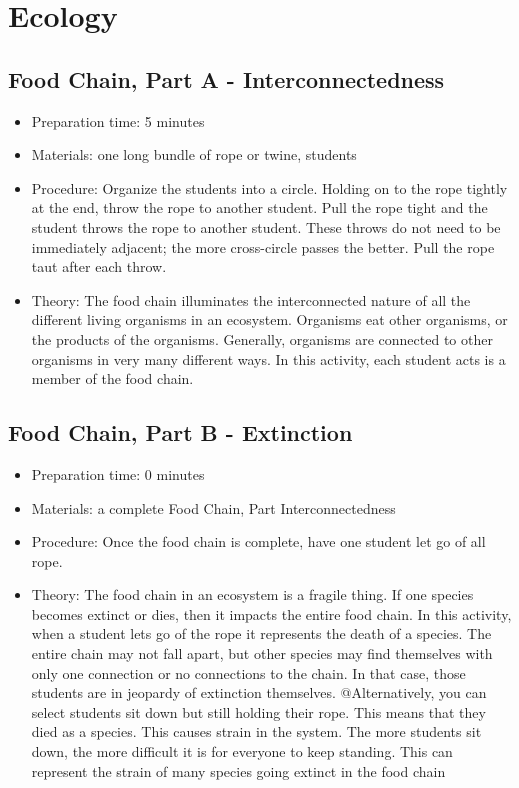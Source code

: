 \section{Ecology}
\subsection{Food Chain, Part A - Interconnectedness}
\begin{itemize}
\item{Preparation time: 5 minutes}
\item{Materials: one long bundle of rope or twine, students}
\item{Procedure: Organize the students into a circle. Holding on to the rope tightly at the end, throw the rope to another student. Pull the rope tight and the student throws the rope to another student. These throws do not need to be immediately adjacent; the more cross-circle passes the better. Pull the rope taut after each throw.}
\item{Theory: The food chain illuminates the interconnected nature of all the different living organisms in an ecosystem. Organisms eat other organisms, or the products of the organisms. Generally, organisms are connected to other organisms in very many different ways. In this activity, each student acts is a member of the food chain.}
\end{itemize}

\subsection{Food Chain, Part B - Extinction}
\begin{itemize}
\item{Preparation time: 0 minutes}
\item{Materials: a complete Food Chain, Part Interconnectedness}
\item{Procedure: Once the food chain is complete, have one student let go of all rope.}
\item{Theory: The food chain in an ecosystem is a fragile thing. If one species becomes extinct or dies, then it impacts the entire food chain. In this activity, when a student lets go of the rope it represents the death of a species. The entire chain may not fall apart, but other species may find themselves with only one connection or no connections to the chain. In that case, those students are in jeopardy of extinction themselves. @Alternatively, you can select students sit down but still holding their rope. This means that they died as a species. This causes strain in the system. The more students sit down, the more difficult it is for everyone to keep standing. This can represent the strain of many species going extinct in the food chain}
\end{itemize}

